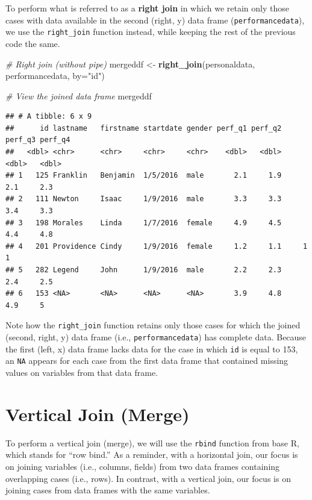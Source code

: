 \documentclass[]{book}
\newenvironment{Shaded}{\begin{snugshade}}{\end{snugshade}}
\newcommand{\KeywordTok}[1]{\textcolor[rgb]{0.13,0.29,0.53}{\textbf{#1}}}
\newcommand{\DataTypeTok}[1]{\textcolor[rgb]{0.13,0.29,0.53}{#1}}
\newcommand{\StringTok}[1]{\textcolor[rgb]{0.31,0.60,0.02}{#1}}
\newcommand{\CommentTok}[1]{\textcolor[rgb]{0.56,0.35,0.01}{\textit{#1}}}
\newcommand{\NormalTok}[1]{#1}
\begin{document}
To perform what is referred to as a \textbf{right join} in which we
retain only those cases with data available in the second (right, y)
data frame (\texttt{performancedata}), we use the \texttt{right\_join}
function instead, while keeping the rest of the previous code the same.

\begin{Shaded}
\begin{Highlighting}[]
\CommentTok{# Right join (without pipe)}
\NormalTok{mergeddf <-}\StringTok{ }\KeywordTok{right_join}\NormalTok{(personaldata, performancedata, }\DataTypeTok{by=}\StringTok{"id"}\NormalTok{)}

\CommentTok{# View the joined data frame}
\NormalTok{mergeddf}
\end{Highlighting}
\end{Shaded}

\begin{verbatim}
## # A tibble: 6 x 9
##      id lastname   firstname startdate gender perf_q1 perf_q2 perf_q3 perf_q4
##   <dbl> <chr>      <chr>     <chr>     <chr>    <dbl>   <dbl>   <dbl>   <dbl>
## 1   125 Franklin   Benjamin  1/5/2016  male       2.1     1.9     2.1     2.3
## 2   111 Newton     Isaac     1/9/2016  male       3.3     3.3     3.4     3.3
## 3   198 Morales    Linda     1/7/2016  female     4.9     4.5     4.4     4.8
## 4   201 Providence Cindy     1/9/2016  female     1.2     1.1     1       1  
## 5   282 Legend     John      1/9/2016  male       2.2     2.3     2.4     2.5
## 6   153 <NA>       <NA>      <NA>      <NA>       3.9     4.8     4.9     5
\end{verbatim}

Note how the \texttt{right\_join} function retains only those cases for
which the joined (second, right, y) data frame (i.e.,
\texttt{performancedata}) has complete data. Because the first (left, x)
data frame lacks data for the case in which \texttt{id} is equal to 153,
an \texttt{NA} appears for each case from the first data frame that
contained missing values on variables from that data frame.

\section{Vertical Join (Merge)}\label{verticaljoin}

To perform a vertical join (merge), we will use the \texttt{rbind}
function from base R, which stands for ``row bind.'' As a reminder, with
a horizontal join, our focus is on joining variables (i.e., columns,
fields) from two data frames containing overlapping cases (i.e., rows).
In contrast, with a vertical join, our focus is on joining cases from
data frames with the same variables.
\end{document}
